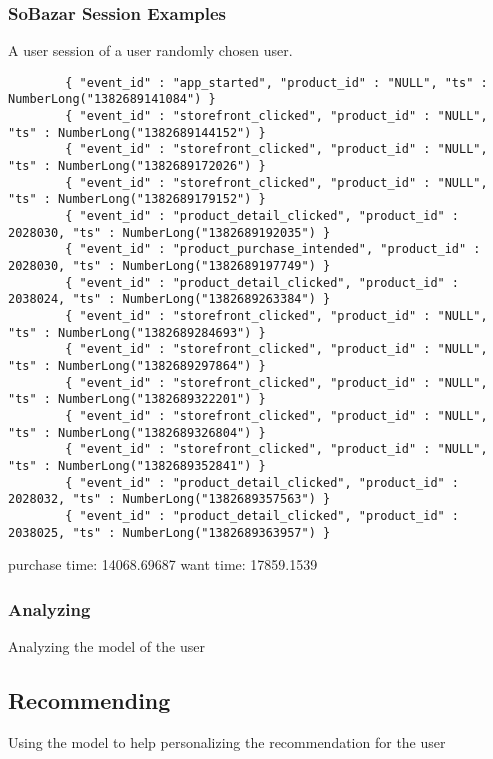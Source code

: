 \subsubsection{SoBazar Session Examples} %
    \label{par:session_examples}
    A user session of a user randomly chosen user.
    \begin{lstlisting}
        { "event_id" : "app_started", "product_id" : "NULL", "ts" : NumberLong("1382689141084") }
        { "event_id" : "storefront_clicked", "product_id" : "NULL", "ts" : NumberLong("1382689144152") }
        { "event_id" : "storefront_clicked", "product_id" : "NULL", "ts" : NumberLong("1382689172026") }
        { "event_id" : "storefront_clicked", "product_id" : "NULL", "ts" : NumberLong("1382689179152") }
        { "event_id" : "product_detail_clicked", "product_id" : 2028030, "ts" : NumberLong("1382689192035") }
        { "event_id" : "product_purchase_intended", "product_id" : 2028030, "ts" : NumberLong("1382689197749") }
        { "event_id" : "product_detail_clicked", "product_id" : 2038024, "ts" : NumberLong("1382689263384") }
        { "event_id" : "storefront_clicked", "product_id" : "NULL", "ts" : NumberLong("1382689284693") }
        { "event_id" : "storefront_clicked", "product_id" : "NULL", "ts" : NumberLong("1382689297864") }
        { "event_id" : "storefront_clicked", "product_id" : "NULL", "ts" : NumberLong("1382689322201") }
        { "event_id" : "storefront_clicked", "product_id" : "NULL", "ts" : NumberLong("1382689326804") }
        { "event_id" : "storefront_clicked", "product_id" : "NULL", "ts" : NumberLong("1382689352841") }
        { "event_id" : "product_detail_clicked", "product_id" : 2028032, "ts" : NumberLong("1382689357563") }
        { "event_id" : "product_detail_clicked", "product_id" : 2038025, "ts" : NumberLong("1382689363957") }
    \end{lstlisting}

    purchase time: 14068.69687
    want time: 17859.1539


\subsubsection{Analyzing}
    Analyzing the model of the user


\subsection{Recommending}
    Using the model to help personalizing the recommendation for the user


